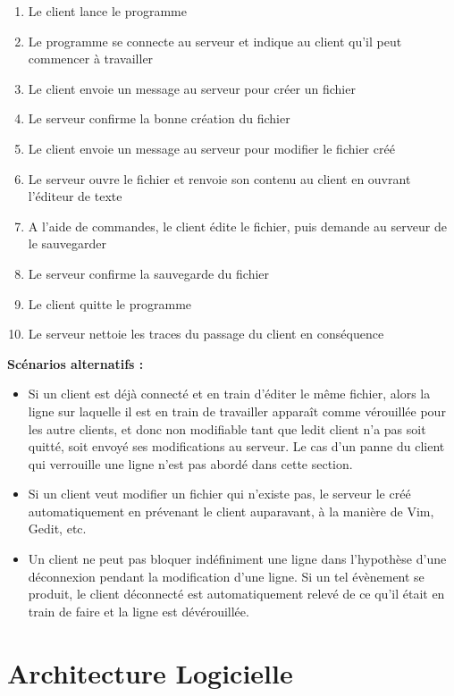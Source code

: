 \documentclass[14pt]{article}
\begin{document}
\begin{enumerate}
\item Le client lance le programme
\item Le programme se connecte au serveur et indique au client qu'il peut commencer à travailler
\item Le client envoie un message au serveur pour créer un fichier
\item Le serveur confirme la bonne création du fichier
\item Le client envoie un message au serveur pour modifier le fichier créé
\item Le serveur ouvre le fichier et renvoie son contenu au client en ouvrant l'éditeur de texte
\item A l'aide de commandes, le client édite le fichier, puis demande au serveur de le sauvegarder
\item Le serveur confirme la sauvegarde du fichier
\item Le client quitte le programme
\item Le serveur nettoie les traces du passage du client en conséquence\\
\end{enumerate}

\textbf{Scénarios alternatifs :}
\begin{itemize}
\item Si un client est déjà connecté et en train d'éditer le même fichier, alors la ligne sur laquelle il est en train de travailler apparaît comme vérouillée pour les autre clients, et donc non modifiable tant que ledit client n'a pas soit quitté, soit envoyé ses modifications au serveur. Le cas d'un panne du client qui verrouille une ligne n'est pas abordé dans cette section.
\item Si un client veut modifier un fichier qui n'existe pas, le serveur le créé automatiquement en prévenant le client auparavant, à la manière de Vim, Gedit, etc.
\item Un client ne peut pas bloquer indéfiniment une ligne dans l'hypothèse d'une déconnexion pendant la modification d'une ligne. Si un tel évènement se produit, le client déconnecté est automatiquement relevé de ce qu'il était en train de faire et la ligne est dévérouillée.
\end{itemize}

\section{Architecture Logicielle}
\end{document}
